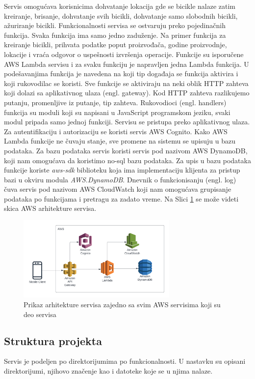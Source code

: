 \documentclass[12pt,oneside]{memoir}
\begin{document}
Servis omogućava korisnicima dohvatanje lokacija gde se bicikle nalaze zatim kreiranje, brisanje, dohvatanje svih bicikli, dohvatanje samo slobodnih bicikli, ažuriranje bicikli. Funkcionalnosti servisa se ostvaruju preko pojedinačnih funkcija. Svaka funkcija ima samo jedno zaduženje. Na primer funkcija za kreiranje bicikli, prihvata podatke poput proizvođača, godine proizvodnje, lokacije i vraća odgovor o uspešnosti izvršenja operacije. Funkcije su isporučene AWS Lambda servisu i za svaku funkciju je napravljen jedna Lambda funkcija. U podešavanjima funkcija je navedena na koji tip događaja se funkcija aktivira i koji rukovodilac se koristi. Sve funkcije se aktiviraju na neki oblik HTTP zahteva koji dolazi sa aplikativnog ulaza (engl. gateway). Kod HTTP zahteva razlikujemo putanju, promenljive iz putanje, tip zahteva. Rukovodioci (engl. handlers) funkcija su moduli koji su napisani u JavaScript programskom jeziku, svaki modul pripada samo jednoj funkciji. Servisu se pristupa preko aplikativnog ulaza. Za autentifikaciju i autorizaciju se koristi servis AWS Cognito. Kako AWS Lambda funkcije ne čuvaju stanje, sve promene na sistemu se upisuju u bazu podataka. Za bazu podataka servis koristi servis pod nazivom AWS DynamoDB, koji nam omogućava da koristimo no-sql bazu podataka. Za upis u bazu podataka funkcije koriste \emph{aws-sdk}  biblioteku koja ima implementaciju klijenta za pristup bazi u okviru modula \emph{AWS.DynamoDB}. Dnevnik o funkcionisanju (engl. log) čuva servis pod nazivom AWS CloudWatch koji nam omogućava grupisanje podataka po funkcijama i pretragu za zadato vreme. Na Slici \ref{fig:awsArchitecture} se može videti skica AWS arhitekture servisa.

\begin{figure}[!ht]
  \centering
  \includegraphics[width=0.7\textwidth]{AWS-Architecture-Overview.PNG}
  \caption{Prikaz arhitekture servisa zajedno sa svim AWS servisima koji su deo servisa}
  \label{fig:awsArchitecture}
\end{figure}


\subsection{Struktura projekta}
Servis je podeljen po direktorijumima po funkcionalnosti. U nastavku su opisani direktorijumi, njihovo značenje kao i datoteke koje se u njima nalaze.
\end{document}
